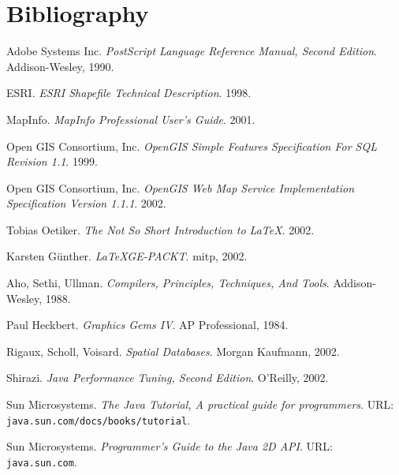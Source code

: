 
\section{Bibliography}

\begin{thebibliography}{99}

Adobe Systems Inc. \emph{PostScript Language Reference Manual, Second
Edition}.  Addison-Wesley, 1990.

ESRI. \emph{ESRI Shapefile Technical Description}. 1998.

MapInfo. \emph{MapInfo Professional User's Guide}. 2001.

Open GIS Consortium, Inc. \emph{OpenGIS Simple Features Specification
For SQL Revision 1.1}.  1999.

Open GIS Consortium, Inc. \emph{OpenGIS Web Map Service Implementation
Specification Version 1.1.1}.  2002.

Tobias Oetiker. \emph{The Not So Short Introduction to
\LaTeX}.  2002.

Karsten G\"unther. \emph{\LaTeX GE-PACKT}. mitp, 2002.

Aho, Sethi, Ullman. \emph{Compilers, Principles, Techniques, And Tools}.
Addison-Wesley, 1988.

Paul Heckbert. \emph{Graphics Gems IV}.
AP Professional, 1984.

Rigaux, Scholl, Voisard. \emph{Spatial Databases}.
Morgan Kaufmann, 2002.

Shirazi. \emph{Java Performance Tuning, Second Edition}.
O'Reilly, 2002.

Sun Microsystems. \emph{The Java Tutorial, A practical guide for programmers}.
URL: \texttt{java.sun.com/docs/books/tutorial}.

Sun Microsystems. \emph{Programmer's Guide to the Java 2D API}.
URL: \texttt{java.sun.com}.

\end{thebibliography}

